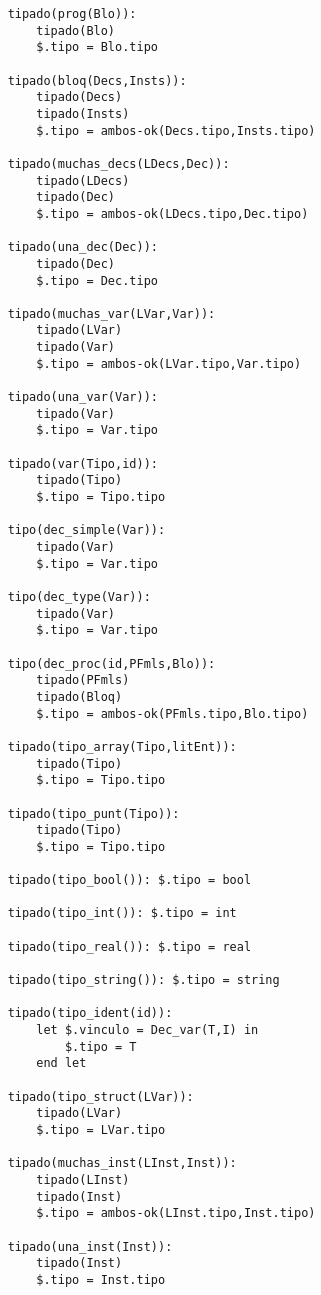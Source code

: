 
\begin{lstlisting}
    tipado(prog(Blo)):
        tipado(Blo)
        $.tipo = Blo.tipo

    tipado(bloq(Decs,Insts)):
        tipado(Decs)
        tipado(Insts)
        $.tipo = ambos-ok(Decs.tipo,Insts.tipo)
        
    tipado(muchas_decs(LDecs,Dec)):
        tipado(LDecs)
        tipado(Dec)
        $.tipo = ambos-ok(LDecs.tipo,Dec.tipo)
    
    tipado(una_dec(Dec)):
        tipado(Dec)
        $.tipo = Dec.tipo

    tipado(muchas_var(LVar,Var)):
        tipado(LVar)
        tipado(Var)
        $.tipo = ambos-ok(LVar.tipo,Var.tipo)

    tipado(una_var(Var)):
        tipado(Var)
        $.tipo = Var.tipo
    
    tipado(var(Tipo,id)):
        tipado(Tipo)
        $.tipo = Tipo.tipo

    tipo(dec_simple(Var)):
        tipado(Var)
        $.tipo = Var.tipo

    tipo(dec_type(Var)):
        tipado(Var)
        $.tipo = Var.tipo
    
    tipo(dec_proc(id,PFmls,Blo)):
        tipado(PFmls)
        tipado(Bloq)
        $.tipo = ambos-ok(PFmls.tipo,Blo.tipo)

    tipado(tipo_array(Tipo,litEnt)):
        tipado(Tipo)
        $.tipo = Tipo.tipo 

    tipado(tipo_punt(Tipo)):
        tipado(Tipo)
        $.tipo = Tipo.tipo

    tipado(tipo_bool()): $.tipo = bool

    tipado(tipo_int()): $.tipo = int

    tipado(tipo_real()): $.tipo = real

    tipado(tipo_string()): $.tipo = string

    tipado(tipo_ident(id)):
        let $.vinculo = Dec_var(T,I) in
            $.tipo = T
        end let

    tipado(tipo_struct(LVar)):
        tipado(LVar)
        $.tipo = LVar.tipo

    tipado(muchas_inst(LInst,Inst)):
        tipado(LInst)
        tipado(Inst)
        $.tipo = ambos-ok(LInst.tipo,Inst.tipo)

    tipado(una_inst(Inst)):
        tipado(Inst)
        $.tipo = Inst.tipo


\end{lstlisting}
